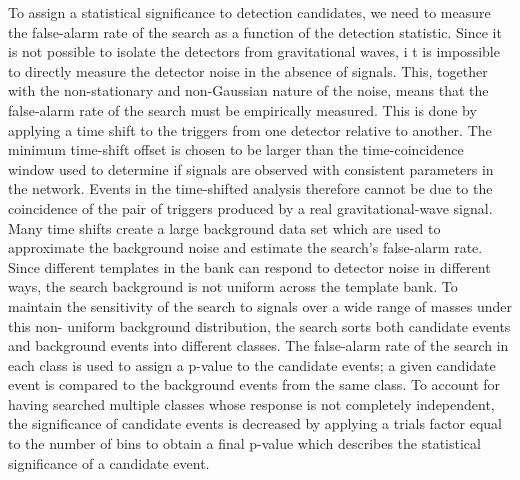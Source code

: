 \documentclass[binding=0.6cm, LaM]{sapthesis}
\begin{document}
	To assign a statistical significance to detection candidates, 
	we need to measure the false-alarm rate of the search as a function of the detection statistic.
	Since it is not possible to isolate the detectors from gravitational waves, i
	t is impossible to directly measure the detector noise in the absence of signals. 
	This, together with the non-stationary and non-Gaussian nature of the noise, 
	means that the false-alarm rate of the search must be empirically measured. 
	This is done by applying a time shift to the triggers from one detector relative to another. 
	The minimum time-shift offset is chosen to be larger than the time-coincidence window 
	used to determine if signals are observed with consistent parameters in the network. 
	Events in the time-shifted analysis therefore cannot be due to the coincidence 
	of the pair of triggers produced by a real gravitational-wave signal. 
	Many time shifts create a large background data set which are used to 
	approximate the background noise and estimate the search’s false-alarm rate. 
	Since different templates in the bank can respond to detector noise in different ways, 
	the search background is not uniform across the template bank. 
	To maintain the sensitivity of the search to signals over a wide range 
	of masses under this non- uniform background distribution, 
	the search sorts both candidate events and background events into different classes. 
	The false-alarm rate of the search in each class is used to 
	assign a p-value to the candidate events; 
	a given candidate event is compared to the background events from the same class. 
	To account for having searched multiple classes 
	whose response is not completely independent, 
	the significance of candidate events is decreased by applying 
	a trials factor equal to the number of bins to obtain a final p-value 
	which describes the statistical significance of a candidate event. 
\end{document}
